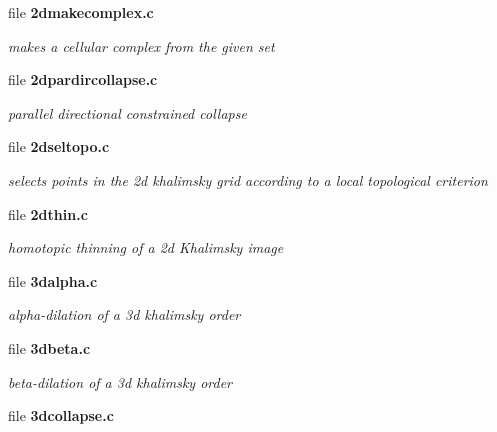 \begin{DoxyCompactItemize}
\item 
file {\bf 2dmakecomplex.c}


\begin{DoxyCompactList}\small\item\em makes a cellular complex from the given set \item\end{DoxyCompactList}

\item 
file {\bf 2dpardircollapse.c}


\begin{DoxyCompactList}\small\item\em parallel directional constrained collapse \item\end{DoxyCompactList}

\item 
file {\bf 2dseltopo.c}


\begin{DoxyCompactList}\small\item\em selects points in the 2d khalimsky grid according to a local topological criterion \item\end{DoxyCompactList}

\item 
file {\bf 2dthin.c}


\begin{DoxyCompactList}\small\item\em homotopic thinning of a 2d Khalimsky image \item\end{DoxyCompactList}

\item 
file {\bf 3dalpha.c}


\begin{DoxyCompactList}\small\item\em alpha-\/dilation of a 3d khalimsky order \item\end{DoxyCompactList}

\item 
file {\bf 3dbeta.c}


\begin{DoxyCompactList}\small\item\em beta-\/dilation of a 3d khalimsky order \item\end{DoxyCompactList}

\item 
file {\bf 3dcollapse.c}



\end{DoxyCompactItemize}
